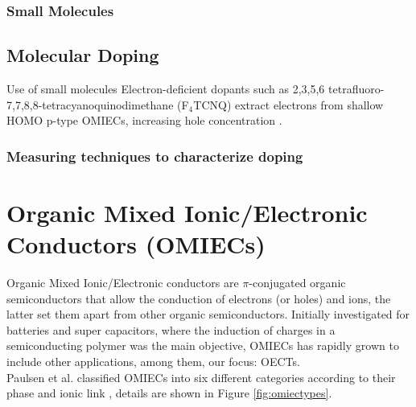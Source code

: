 \subsubsection{Small Molecules}


\subsection{Molecular Doping}

Use of small molecules
Electron-deficient dopants such as 2,3,5,6 tetrafluoro-7,7,8,8-tetracyanoquinodimethane (F$_{4}$TCNQ) extract electrons from shallow HOMO p-type OMIECs, increasing hole concentration \cite{tanOrganicMixedIonic2022}.

\subsubsection{Measuring techniques to characterize doping}

\section{Organic Mixed Ionic/Electronic Conductors (OMIECs)}

Organic Mixed Ionic/Electronic conductors are $\pi$-conjugated organic semiconductors that allow the conduction of electrons (or holes) and ions, the latter set them apart from other organic semiconductors. %
Initially investigated for batteries and super capacitors, %
where the induction of charges in a semiconducting polymer was the main objective, OMIECs has rapidly grown to include other applications, among them, our focus: OECTs.\\
Paulsen et al. classified OMIECs into six different categories according to their phase and ionic link \cite{paulsenOrganicMixedIonic2020}, details are shown in Figure \ref{fig:omiectypes}. 



